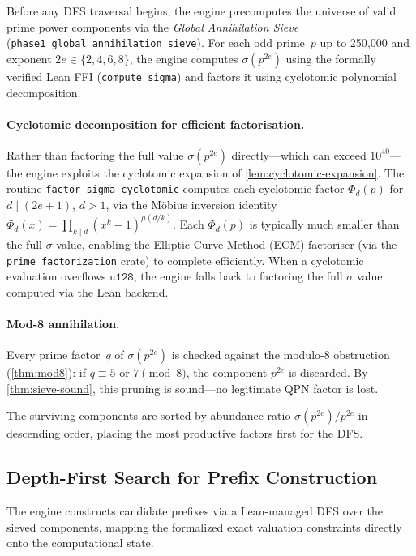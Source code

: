 Before any DFS traversal begins, the engine precomputes the universe of
valid prime power components via the \emph{Global Annihilation Sieve}
(\texttt{phase1\_\allowbreak{}global\_\allowbreak{}annihilation\_\allowbreak{}sieve}).
For each odd prime~$p$ up to 250{,}000 and exponent
$2e \in \{2, 4, 6, 8\}$, the engine computes $\sigma(p^{2e})$ using the
formally verified Lean FFI (\texttt{compute\_\allowbreak{}sigma}) and
factors it using cyclotomic polynomial decomposition.

\paragraph{Cyclotomic decomposition for efficient factorisation.}
Rather than factoring the full value $\sigma(p^{2e})$ directly---which
can exceed $10^{40}$---the engine exploits the cyclotomic expansion of
\cref{lem:cyclotomic-expansion}.  The routine
\texttt{factor\_\allowbreak{}sigma\_\allowbreak{}cyclotomic} computes
each cyclotomic factor $\Phi_d(p)$ for $d \mid (2e+1)$, $d > 1$, via
the M\"obius inversion identity
$\Phi_d(x) = \prod_{k \mid d} (x^k - 1)^{\mu(d/k)}$.  Each
$\Phi_d(p)$ is typically much smaller than the full $\sigma$ value,
enabling the Elliptic Curve Method (ECM) factoriser (via the
\texttt{prime\_\allowbreak{}factorization} crate) to complete
efficiently.  When a cyclotomic evaluation overflows $\mathtt{u128}$,
the engine falls back to factoring the full $\sigma$ value computed via
the Lean backend.

\paragraph{Mod-8 annihilation.}
Every prime factor~$q$ of $\sigma(p^{2e})$ is checked against the
modulo-8 obstruction (\cref{thm:mod8}): if $q \equiv 5$ or
$7 \pmod 8$, the component $p^{2e}$ is discarded.  By
\cref{thm:sieve-sound}, this pruning is sound---no legitimate QPN
factor is lost.

The surviving components are sorted by abundance ratio
$\sigma(p^{2e})/p^{2e}$ in descending order, placing the most
productive factors first for the DFS.

\subsection{Depth-First Search for Prefix Construction}
\label{subsec:dfs_prefix}

The engine constructs candidate prefixes via a Lean-managed DFS over the
sieved components, mapping the formalized exact valuation
constraints directly onto the computational state.

